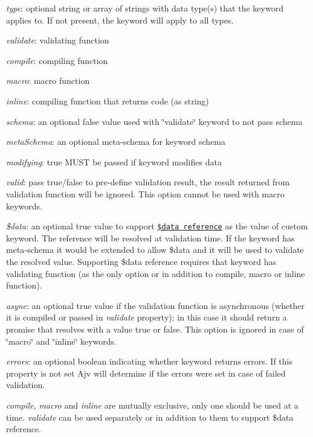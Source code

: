 \begin{DoxyItemize}
\item {\itshape type}\+: optional string or array of strings with data type(s) that the keyword applies to. If not present, the keyword will apply to all types.
\item {\itshape validate}\+: validating function
\item {\itshape compile}\+: compiling function
\item {\itshape macro}\+: macro function
\item {\itshape inline}\+: compiling function that returns code (as string)
\item {\itshape schema}\+: an optional {\ttfamily false} value used with \char`\"{}validate\char`\"{} keyword to not pass schema
\item {\itshape meta\+Schema}\+: an optional meta-\/schema for keyword schema
\item {\itshape modifying}\+: {\ttfamily true} M\+U\+ST be passed if keyword modifies data
\item {\itshape valid}\+: pass {\ttfamily true}/{\ttfamily false} to pre-\/define validation result, the result returned from validation function will be ignored. This option cannot be used with macro keywords.
\item {\itshape \$data}\+: an optional {\ttfamily true} value to support \href{#data-reference}{\tt \$data reference} as the value of custom keyword. The reference will be resolved at validation time. If the keyword has meta-\/schema it would be extended to allow \$data and it will be used to validate the resolved value. Supporting \$data reference requires that keyword has validating function (as the only option or in addition to compile, macro or inline function).
\item {\itshape async}\+: an optional {\ttfamily true} value if the validation function is asynchronous (whether it is compiled or passed in {\itshape validate} property); in this case it should return a promise that resolves with a value {\ttfamily true} or {\ttfamily false}. This option is ignored in case of \char`\"{}macro\char`\"{} and \char`\"{}inline\char`\"{} keywords.
\item {\itshape errors}\+: an optional boolean indicating whether keyword returns errors. If this property is not set Ajv will determine if the errors were set in case of failed validation.
\end{DoxyItemize}

{\itshape compile}, {\itshape macro} and {\itshape inline} are mutually exclusive, only one should be used at a time. {\itshape validate} can be used separately or in addition to them to support \$data reference.

